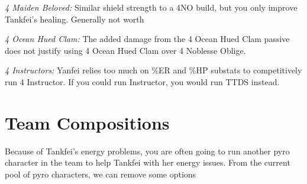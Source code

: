\documentclass[11pt]{article}
\begin{document}
\textit{4 Maiden Beloved:} Similar shield strength to a 4NO build, but you only improve Tankfei's healing. Generally not worth 

\textit{4 Ocean Hued Clam:} The added damage from the 4 Ocean Hued Clam passive does not justify using 4 Ocean Hued Clam over 4 Noblesse Oblige.  

\textit{4 Instructors:} Yanfei relies too much on \%ER and \%HP substats to competitively run 4 Instructor. If you could run Instructor, you would run TTDS instead. 



\newpage 

\section{Team Compositions}

Because of Tankfei's energy problems, you are often going to run another pyro character in the team to help Tankfei with her energy issues. From the current pool of pyro characters, we can remove some options
\end{document}
